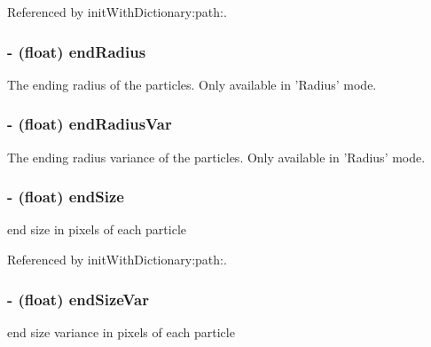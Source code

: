Referenced by init\-With\-Dictionary\-:path\-:.

\hypertarget{interface_c_c_particle_system_a66a281e16741b580235d0dbc0e0b140e}{
\subsubsection[{end\-Radius}]{\setlength{\rightskip}{0pt plus 5cm}-\/ (float) {\bf end\-Radius}}}\label{interface_c_c_particle_system_a66a281e16741b580235d0dbc0e0b140e}
The ending radius of the particles. Only available in 'Radius' mode. \hypertarget{interface_c_c_particle_system_a53cce2870ee64bdbcdc612215128aff3}{
\subsubsection[{end\-Radius\-Var}]{\setlength{\rightskip}{0pt plus 5cm}-\/ (float) {\bf end\-Radius\-Var}}}\label{interface_c_c_particle_system_a53cce2870ee64bdbcdc612215128aff3}
The ending radius variance of the particles. Only available in 'Radius' mode. \hypertarget{interface_c_c_particle_system_aaf20369f6b7c2c715a55f3d33fcc91d8}{
\subsubsection[{end\-Size}]{\setlength{\rightskip}{0pt plus 5cm}-\/ (float) {\bf end\-Size}}}\label{interface_c_c_particle_system_aaf20369f6b7c2c715a55f3d33fcc91d8}
end size in pixels of each particle 

Referenced by init\-With\-Dictionary\-:path\-:.

\hypertarget{interface_c_c_particle_system_ac8abe45d12a4686d1e5cd1b3b67a6dc1}{
\subsubsection[{end\-Size\-Var}]{\setlength{\rightskip}{0pt plus 5cm}-\/ (float) {\bf end\-Size\-Var}}}\label{interface_c_c_particle_system_ac8abe45d12a4686d1e5cd1b3b67a6dc1}
end size variance in pixels of each particle 

